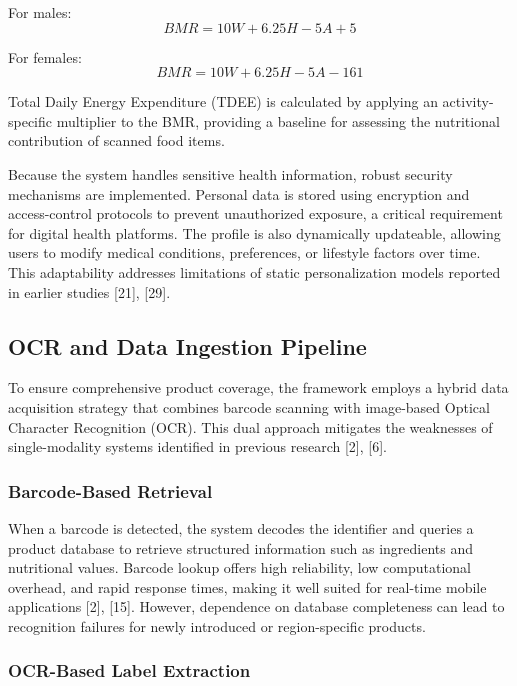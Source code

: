 \documentclass[conference]{IEEEtran}
\begin{document}
For males:
\begin{equation}
BMR = 10W + 6.25H - 5A + 5
\end{equation}

For females:
\begin{equation}
BMR = 10W + 6.25H - 5A - 161
\end{equation}

Total Daily Energy Expenditure (TDEE) is calculated by applying an activity-specific multiplier to the BMR, providing a baseline for assessing the nutritional contribution of scanned food items.

Because the system handles sensitive health information, robust security mechanisms are implemented. Personal data is stored using encryption and access-control protocols to prevent unauthorized exposure, a critical requirement for digital health platforms. The profile is also dynamically updateable, allowing users to modify medical conditions, preferences, or lifestyle factors over time. This adaptability addresses limitations of static personalization models reported in earlier studies [21], [29].

\subsection{OCR and Data Ingestion Pipeline}

To ensure comprehensive product coverage, the framework employs a hybrid data acquisition strategy that combines barcode scanning with image-based Optical Character Recognition (OCR). This dual approach mitigates the weaknesses of single-modality systems identified in previous research [2], [6].

\subsubsection{Barcode-Based Retrieval}

When a barcode is detected, the system decodes the identifier and queries a product database to retrieve structured information such as ingredients and nutritional values. Barcode lookup offers high reliability, low computational overhead, and rapid response times, making it well suited for real-time mobile applications [2], [15]. However, dependence on database completeness can lead to recognition failures for newly introduced or region-specific products.

\subsubsection{OCR-Based Label Extraction}
\end{document}
